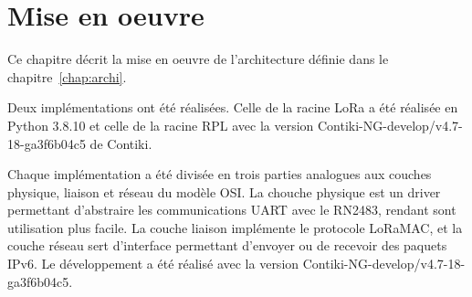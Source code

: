 \renewcommand{\leftmark}{MISE EN OEUVRE}
\chapter{Mise en oeuvre}\label{chap:work}
    Ce chapitre décrit la mise en oeuvre de l'architecture définie dans le
    chapitre~\ref{chap:archi}.

    Deux implémentations ont été réalisées. Celle de la racine LoRa a été réalisée en Python 3.8.10 et celle de la racine RPL avec la version Contiki-NG-develop/v4.7-18-ga3f6b04c5 de Contiki.

    Chaque implémentation a été divisée en trois parties analogues aux couches physique, liaison et réseau du modèle OSI. La chouche physique est un driver permettant d'abstraire les communications UART avec le RN2483, rendant sont utilisation plus facile. La couche liaison implémente le protocole LoRaMAC, et la couche réseau sert d'interface permettant d'envoyer ou de recevoir des paquets IPv6.
    Le développement a été réalisé avec la version Contiki-NG-develop/v4.7-18-ga3f6b04c5.

%